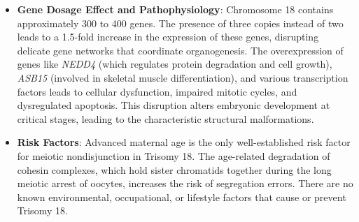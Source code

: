 \begin{itemize}
    \item \textbf{Gene Dosage Effect and Pathophysiology}: Chromosome 18 contains approximately 300 to 400 genes. The presence of three copies instead of two leads to a 1.5-fold increase in the expression of these genes, disrupting delicate gene networks that coordinate organogenesis. The overexpression of genes like \textit{NEDD4} (which regulates protein degradation and cell growth), \textit{ASB15} (involved in skeletal muscle differentiation), and various transcription factors leads to cellular dysfunction, impaired mitotic cycles, and dysregulated apoptosis. This disruption alters embryonic development at critical stages, leading to the characteristic structural malformations.
    \item \textbf{Risk Factors}: Advanced maternal age is the only well-established risk factor for meiotic nondisjunction in Trisomy 18. The age-related degradation of cohesin complexes, which hold sister chromatids together during the long meiotic arrest of oocytes, increases the risk of segregation errors. There are no known environmental, occupational, or lifestyle factors that cause or prevent Trisomy 18.
\end{itemize}

